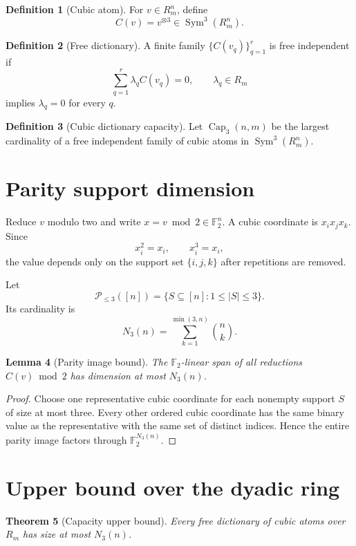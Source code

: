 \documentclass[11pt]{article}
\newtheorem{theorem}{Theorem}
\newtheorem{lemma}[theorem]{Lemma}
\theoremstyle{definition}
\newtheorem{definition}[theorem]{Definition}
\newcommand{\F}{\mathbb F}
\newcommand{\Sym}{\operatorname{Sym}}
\newcommand{\CubCap}{\operatorname{Cap}}
\begin{document}
\begin{definition}[Cubic atom]
For \(v\in R_m^n\), define
\[
C(v)=v^{\otimes3}\in\Sym^3(R_m^n).
\]
\end{definition}

\begin{definition}[Free dictionary]
A finite family \(\{C(v_q)\}_{q=1}^r\) is free independent if
\[
\sum_{q=1}^r\lambda_q C(v_q)=0,\qquad \lambda_q\in R_m
\]
implies \(\lambda_q=0\) for every \(q\).
\end{definition}

\begin{definition}[Cubic dictionary capacity]
Let \(\CubCap_3(n,m)\) be the largest cardinality of a free independent family of cubic atoms in \(\Sym^3(R_m^n)\).
\end{definition}

\section{Parity support dimension}
Reduce \(v\) modulo two and write \(x=v\bmod2\in\F_2^n\). A cubic coordinate is \(x_ix_jx_k\). Since
\[
x_i^2=x_i,\qquad x_i^3=x_i,
\]
the value depends only on the support set \(\{i,j,k\}\) after repetitions are removed.

Let
\[
\mathcal P_{\le3}([n])=\{S\subseteq[n]:1\le |S|\le3\}.
\]
Its cardinality is
\[
N_3(n)=\sum_{k=1}^{\min(3,n)}\binom nk.
\]

\begin{lemma}[Parity image bound]\label{lem:parity}
The \(\F_2\)-linear span of all reductions \(C(v)\bmod2\) has dimension at most \(N_3(n)\).
\end{lemma}

\begin{proof}
Choose one representative cubic coordinate for each nonempty support \(S\) of size at most three. Every other ordered cubic coordinate has the same binary value as the representative with the same set of distinct indices. Hence the entire parity image factors through \(\F_2^{N_3(n)}\).
\end{proof}

\section{Upper bound over the dyadic ring}
\begin{theorem}[Capacity upper bound]\label{thm:upper}
Every free dictionary of cubic atoms over \(R_m\) has size at most \(N_3(n)\).
\end{theorem}
\end{document}
